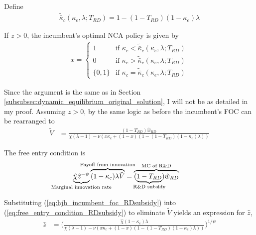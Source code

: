 \documentclass[11pt,english]{article}
\begin{document}
Define
\begin{align}
	\tilde{\bar{\kappa}}_c(\kappa_e,\lambda;T_{RD}) = 1 - (1-T_{RD})(1-\kappa_e)\lambda
\end{align} 

If $z > 0$, the incumbent's optimal NCA policy is given by 
\begin{align}
x = \begin{cases}
1 & \textrm{if } \kappa_{c} < \tilde{\bar{\kappa}}_c (\kappa_e, \lambda;T_{RD}) \\
0 & \textrm{if } \kappa_{c} > \tilde{\bar{\kappa}}_c (\kappa_e, \lambda;T_{RD})\\
\{0,1\} & \textrm{if } \kappa_c = \tilde{\bar{\kappa}}_c (\kappa_e, \lambda;T_{RD})
\end{cases} \label{eq:nca_policy_RDsubsidy}
\end{align}

Since the argument is the same as in Section \ref{subsubsec:dynamic_equilibrium_original_solution}, I will not be as detailed in my proof. Assuming $z > 0$, by the same logic as before the incumbent's FOC can be rearranged to
\begin{align}
	\tilde{V} &= \frac{(1-T_{RD})\hat{w}_{RD}}{\chi(\lambda -1) - \nu (x\kappa_c + (1-x)(1 - (1-T_{RD})(1-\kappa_e)\lambda)) } \label{eq:hjb_incumbent_foc_RDsubsidy}
\end{align}

The free entry condition is
\begin{align}
\underbrace{\hat{\chi} \hat{z}^{-\psi}}_{\mathclap{\text{Marginal innovation rate}}} \overbrace{(1-\kappa_e) \lambda \tilde{V}}^{\mathclap{\text{Payoff from innovation}}} &= \overbrace{(\underbrace{1-T_{RD}}_{\mathclap{\text{R\&D subsidy}}})\hat{w}_{RD}}^{\mathclap{\text{MC of R\&D}}} \label{eq:free_entry_condition_RDsubsidy}
\end{align}

Substituting (\ref{eq:hjb_incumbent_foc_RDsubsidy}) into (\ref{eq:free_entry_condition_RDsubsidy}) to eliminate $\tilde{V}$ yields an expression for $\hat{z}$, 
\begin{align}
\hat{z} &= \Bigg( \frac{\hat{\chi} (1-\kappa_{e}) \lambda}{\chi(\lambda -1) - \nu (x\kappa_c + (1-x)(1 - (1-T_{RD})(1-\kappa_e)\lambda)) } \Bigg)^{1/\psi} \label{eq:effort_entrant_RDsubsidy}
\end{align}
\end{document}
